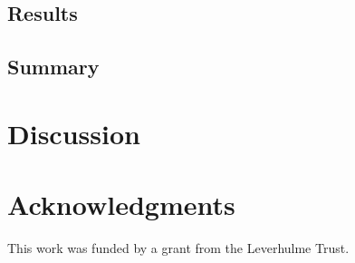 \documentclass[doc,biblatex]{apa7}
\begin{document}
\subsection{Results}



\subsection{Summary}


\section{Discussion}


\section{Acknowledgments}

\noindent This work was funded by a grant from the Leverhulme Trust.

\printbibliography
\end{document}
